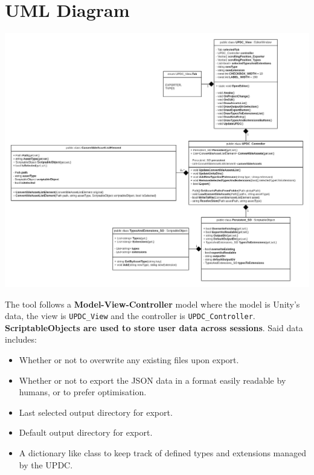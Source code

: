 \documentclass[12pt,a4paper]{article}
\begin{document}
\section{UML Diagram}
\begin{center}
\includegraphics[scale=0.25]{UPDCUML}
\end{center}
\noindent The tool follows a \textbf{Model-View-Controller} model where the model is Unity's data, the view is \texttt{UPDC\_View} and the controller is \texttt{UPDC\_Controller}.\\
\textbf{ScriptableObjects are used to store user data across sessions}. Said data includes:
\begin{itemize}
\item Whether or not to overwrite any existing files upon export.
\item Whether or not to export the JSON data in a format easily readable by humans, or to prefer optimisation.
\item Last selected output directory for export.
\item Default output directory for export.
\item A dictionary like class to keep track of defined types and extensions managed by the UPDC.
\end{itemize}
\newpage
\end{document}
